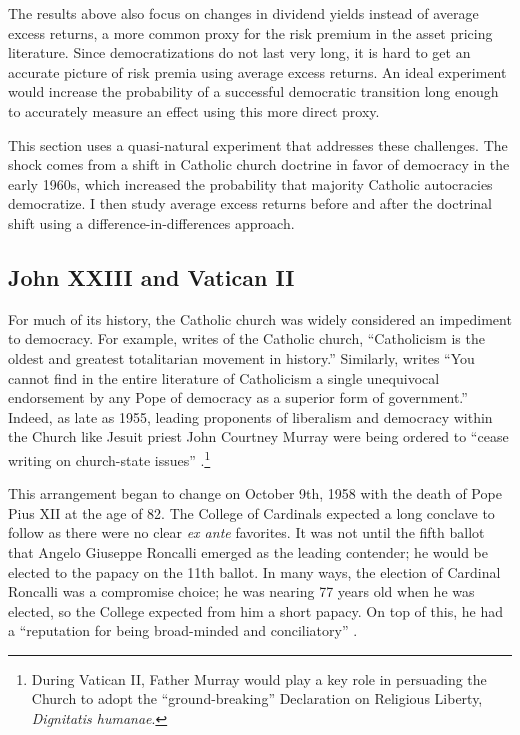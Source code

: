 \documentclass[12pt]{article}
\numberwithin{equation}{section}
\begin{document}
The results above also focus on changes in dividend yields instead of average excess returns, a more common proxy for the risk premium in the asset pricing literature.  Since democratizations do not last very long, it is hard to get an accurate picture of risk premia using average excess returns. An ideal experiment would increase the probability of a successful democratic transition long enough to accurately measure an effect using this more direct proxy.

This section uses a quasi-natural experiment that addresses these challenges. The shock comes from a shift in Catholic church doctrine in favor of democracy in the early 1960s, which increased the probability that majority Catholic autocracies democratize. I then study average excess returns before and after the doctrinal shift using a difference-in-differences approach.

\subsection{John XXIII and Vatican II}
\label{par:historical_context_beg}
For much of its history, the Catholic church was widely considered an impediment to democracy. For example, \cite{Hook1940} writes of the Catholic church, ``Catholicism is the oldest and greatest totalitarian movement in history.'' Similarly, \cite{Blanshard1949} writes ``You cannot find in the entire literature of Catholicism a single unequivocal endorsement by any Pope of democracy as a superior form of government.'' Indeed, as late as 1955, leading proponents of liberalism and democracy within the Church like Jesuit priest John Courtney Murray were being ordered to ``cease writing on church-state issues'' \citep{Philpott2004}.\footnote{During Vatican II, Father Murray would play a key role in persuading the Church to adopt the ``ground-breaking'' Declaration on Religious Liberty, \textit{Dignitatis humanae}.}

This arrangement began to change on October 9th, 1958 with the death of Pope Pius XII at the age of 82. The College of Cardinals expected a long conclave to follow as there were no clear \textit{ex ante} favorites. It was not until the fifth ballot that Angelo Giuseppe Roncalli emerged as the leading contender; he would be elected to the papacy on the 11th ballot. In many ways, the election of Cardinal Roncalli was a compromise choice; he was nearing 77 years old when he was elected, so the College expected from him a short papacy. On top of this, he had a ``reputation for being broad-minded and conciliatory'' \citep{Hofmann1958}.
	
\end{document}
